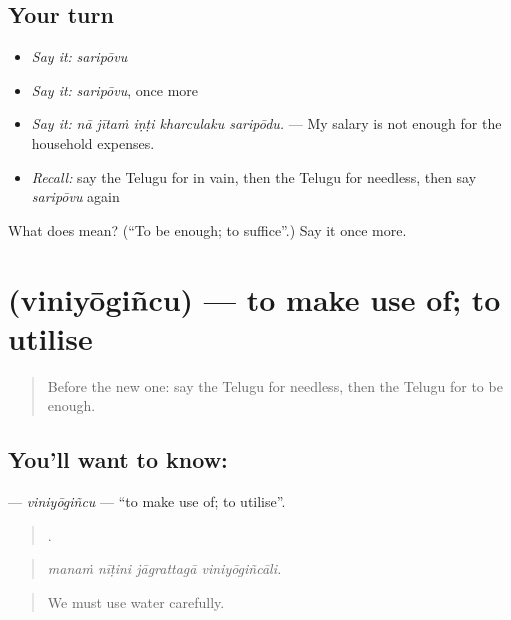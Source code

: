 \subsection*{Your turn}
\begin{itemize}
\raggedright
  \item \emph{Say it:} \emph{saripōvu}
  \item \emph{Say it:} \emph{saripōvu}, once more
  \item \emph{Say it:} \emph{nā jītaṁ iṇṭi kharculaku saripōdu.} — My salary is not enough for the household expenses.
  \item \emph{Recall:} say the Telugu for in vain, then the Telugu for needless, then say \emph{saripōvu} again
\end{itemize}

\begin{tcolorbox}[breakable,colback=teal!4,colframe=teal!35!black,title={Before you move on}]
What does  mean? (\textquotedblleft{}To be enough; to suffice\textquotedblright{}.) Say it once more.
\end{tcolorbox}
\section[\texorpdfstring{\te{వినియోగించు} (viniyōgiñcu)}{వినియోగించు (viniyōgiñcu)}]{ (viniyōgiñcu) — to make use of; to utilise}

\label{lesson:TE-C423-viniyogincu}



\begin{quote}
Before the new one: say the Telugu for needless, then the Telugu for to be enough.
\end{quote}

\subsection*{You'll want to know: }
\textbf{} — \emph{viniyōgiñcu} — \textquotedblleft{}to make use of; to utilise\textquotedblright{}.

\begin{quote}
   .
\end{quote}

\begin{quote}
\emph{manaṁ nīṭini jāgrattagā viniyōgiñcāli.}
\end{quote}

\begin{quote}
We must use water carefully.
\end{quote}

